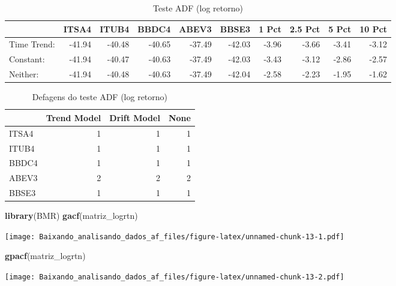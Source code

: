 \documentclass[]{article}
\newenvironment{Shaded}{\begin{snugshade}}{\end{snugshade}}
\newcommand{\KeywordTok}[1]{\textcolor[rgb]{0.13,0.29,0.53}{\textbf{{#1}}}}
\newcommand{\DataTypeTok}[1]{\textcolor[rgb]{0.13,0.29,0.53}{{#1}}}
\newcommand{\DecValTok}[1]{\textcolor[rgb]{0.00,0.00,0.81}{{#1}}}
\newcommand{\StringTok}[1]{\textcolor[rgb]{0.31,0.60,0.02}{{#1}}}
\newcommand{\OtherTok}[1]{\textcolor[rgb]{0.56,0.35,0.01}{{#1}}}
\newcommand{\NormalTok}[1]{{#1}}
\begin{document}
\begin{longtable}[t]{lrrrrrrrrr}
\caption{\label{tab:unnamed-chunk-12}Teste ADF (log retorno)}\\
\toprule
  & ITSA4 & ITUB4 & BBDC4 & ABEV3 & BBSE3 & 1 Pct & 2.5 Pct & 5 Pct & 10 Pct\\
\midrule
Time Trend: & -41.94 & -40.48 & -40.65 & -37.49 & -42.03 & -3.96 & -3.66 & -3.41 & -3.12\\
Constant: & -41.94 & -40.47 & -40.63 & -37.49 & -42.03 & -3.43 & -3.12 & -2.86 & -2.57\\
Neither: & -41.94 & -40.48 & -40.63 & -37.49 & -42.04 & -2.58 & -2.23 & -1.95 & -1.62\\
\bottomrule
\end{longtable}

\begin{Shaded}
\end{Shaded}

\begin{longtable}[t]{lrrr}
\caption{\label{tab:unnamed-chunk-12}Defagens do teste ADF (log retorno)}\\
\toprule
  & Trend Model & Drift Model & None\\
\midrule
ITSA4 & 1 & 1 & 1\\
ITUB4 & 1 & 1 & 1\\
BBDC4 & 1 & 1 & 1\\
ABEV3 & 2 & 2 & 2\\
BBSE3 & 1 & 1 & 1\\
\bottomrule
\end{longtable}

\begin{Shaded}
\begin{Highlighting}[]
\KeywordTok{library}\NormalTok{(BMR)}
\KeywordTok{gacf}\NormalTok{(matriz_logrtn)}
\end{Highlighting}
\end{Shaded}

\texttt{[image: Baixando\_analisando\_dados\_af\_files/figure-latex/unnamed-chunk-13-1.pdf]}

\begin{Shaded}
\begin{Highlighting}[]
\KeywordTok{gpacf}\NormalTok{(matriz_logrtn)}
\end{Highlighting}
\end{Shaded}

\texttt{[image: Baixando\_analisando\_dados\_af\_files/figure-latex/unnamed-chunk-13-2.pdf]}
\end{document}
